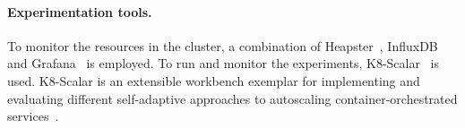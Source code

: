 \paragraph{Experimentation tools.}
\label{tools}
%
To monitor the resources in the cluster, a combination of Heapster~\citep{heapster}, InfluxDB~\citep{influxdb} and Grafana~\citep{grafana} is employed. To run and monitor the experiments, K8-Scalar~\citep{scalar} is used. K8-Scalar is an extensible workbench exemplar for implementing and evaluating different self-adaptive approaches to autoscaling container-orchestrated services~\citep{scalar-github-overview}.

 
%
%
